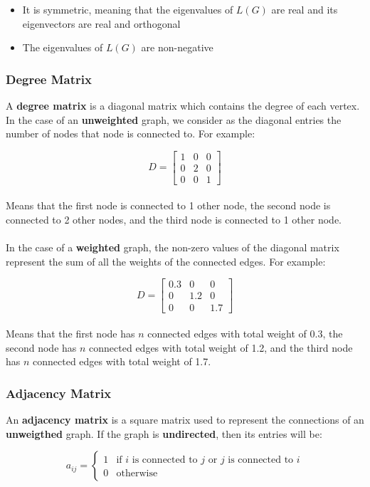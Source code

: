 \documentclass{article}
\begin{document}
\begin{itemize}
	\item It is symmetric, meaning that the eigenvalues of $L(G)$ are real and its eigenvectors are real and orthogonal
	\item The eigenvalues of $L(G)$ are non-negative
\end{itemize}

\subsubsection{Degree Matrix}
A \textbf{degree matrix} is a diagonal matrix which contains the degree of each vertex. In the case of an \textbf{unweighted} graph, we consider as the diagonal entries the number of nodes that node is connected to. For example:

\[ D = \begin{bmatrix} 1 & 0 & 0 \\ 0 & 2 & 0 \\ 0 & 0 & 1 \end{bmatrix} \] \\
Means that the first node is connected to 1 other node, the second node is connected to 2 other nodes, and the third node is connected to 1 other node. \\ \\
In the case of a \textbf{weighted} graph, the non-zero values of the diagonal matrix represent the sum of all the weights of the connected edges. For example:

\[ D = \begin{bmatrix} 0.3 & 0 & 0 \\ 0 & 1.2 & 0 \\ 0 & 0 & 1.7 \end{bmatrix} \] \\
Means that the first node has $n$ connected edges with total weight of 0.3, the second node has $n$ connected edges with total weight of 1.2, and the third node has $n$ connected edges with total weight of 1.7.

\subsubsection{Adjacency Matrix}
An \textbf{adjacency matrix} is a square matrix used to represent the connections of an \textbf{unweigthed} graph. If the graph is \textbf{undirected}, then its entries will be:

\[ a_{ij} = \begin{cases} 1 & \text{if $i$ is connected to $j$ or $j$ is connected to $i$} \\ 0 & \text{otherwise} \end{cases} \]
\end{document}
